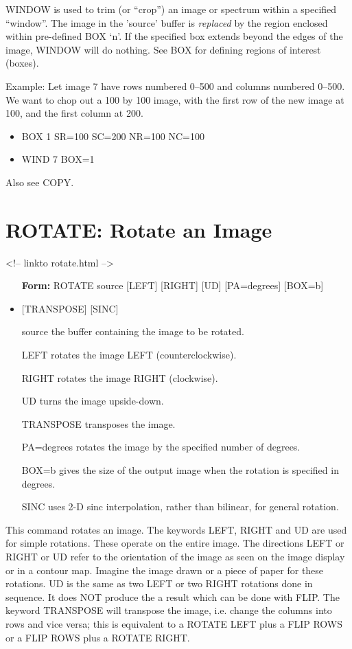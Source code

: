 WINDOW is used to trim (or ``crop'') an image or spectrum within a
specified ``window''.  The image in the 'source' buffer is 
\textit{replaced} by the region enclosed within pre-defined BOX `n'. 
If the specified box extends beyond the edges of the image, WINDOW will do
nothing.  See BOX for defining regions of interest (boxes).

Example: Let image 7 have rows numbered 0--500 and columns numbered 0--500.
We want to chop out a 100 by 100 image, with the first row of the new image
at 100, and the first column at 200.
\begin{itemize}
  \item{BOX 1 SR=100 SC=200 NR=100 NC=100}
  \item{WIND 7 BOX=1}
\end{itemize}

Also see COPY.

\section{ROTATE: Rotate an Image}
\begin{rawhtml}
<!-- linkto rotate.html -->
\end{rawhtml}
\begin{itemize}
  \item[\textbf{Form: }   ROTATE source {[LEFT]} {[RIGHT]} {[UD]} 
       {[PA=degrees]} {[BOX=b]} \hfill]{}
  \item{{[TRANSPOSE]} {[SINC]}}
  \item[source]{the buffer containing the image to be rotated.}
  \item[LEFT]{rotates the image LEFT (counterclockwise).}
  \item[RIGHT]{rotates the image RIGHT (clockwise).}
  \item[UD]{turns the image upside-down.}
  \item[TRANSPOSE]{transposes the image.}
  \item[PA=degrees]{rotates the image by the specified number of degrees.}
  \item[BOX=b]{gives the size of the output image when the rotation is 
       specified in degrees.}
  \item[SINC]{uses 2-D sinc interpolation, rather than bilinear,
       for general rotation.}
\end{itemize}

This command rotates an image.  The keywords LEFT, RIGHT and UD are used
for simple rotations.  These operate on the entire image.  The directions
LEFT or RIGHT or UD refer to the orientation of the image as seen on the
image display or in a contour map.  Imagine the image drawn or a piece of paper
for these rotations.  UD is the same as two LEFT or two RIGHT rotations
done in sequence.  It does NOT produce the a result which can be done with
FLIP. The keyword TRANSPOSE will transpose the image, i.e. change the
columns into rows and vice versa; this is equivalent to a ROTATE LEFT plus
a FLIP ROWS or a FLIP ROWS plus a ROTATE RIGHT.


